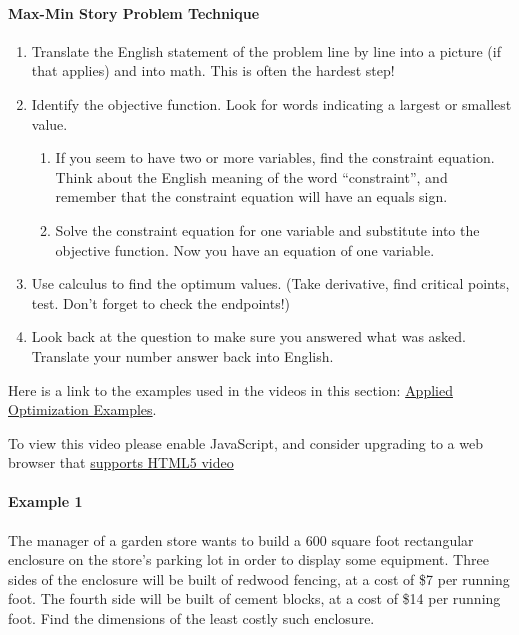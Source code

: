 \hypertarget{max-min-story-problem-technique}{%
\paragraph{Max-Min Story Problem
Technique}\label{max-min-story-problem-technique}}

\begin{enumerate}
\item
  Translate the English statement of the problem line by line into a
  picture (if that applies) and into math. This is often the hardest
  step!
\item
  Identify the objective function. Look for words indicating a largest
  or smallest value.

  \begin{enumerate}
  \tightlist
  \item
    If you seem to have two or more variables, find the constraint
    equation. Think about the English meaning of the word
    ``constraint'', and remember that the constraint equation will have
    an equals sign.
  \item
    Solve the constraint equation for one variable and substitute into
    the objective function. Now you have an equation of one variable.
  \end{enumerate}
\item
  Use calculus to find the optimum values. (Take derivative, find
  critical points, test. Don't forget to check the endpoints!)
\item
  Look back at the question to make sure you answered what was asked.
  Translate your number answer back into English.
\end{enumerate}

Here is a link to the examples used in the videos in this section:
\href{otherfiles/applied_optimization_problems_math141.pdf}{Applied
Optimization Examples}.

To view this video please enable JavaScript, and consider upgrading to a
web browser that \href{http://videojs.com/html5-video-support/}{supports
HTML5 video}

\hypertarget{example-1}{%
\paragraph{Example 1}\label{example-1}}

The manager of a garden store wants to build a 600 square foot
rectangular enclosure on the store's parking lot in order to display
some equipment. Three sides of the enclosure will be built of redwood
fencing, at a cost of \$7 per running foot. The fourth side will be
built of cement blocks, at a cost of \$14 per running foot. Find the
dimensions of the least costly such enclosure.

